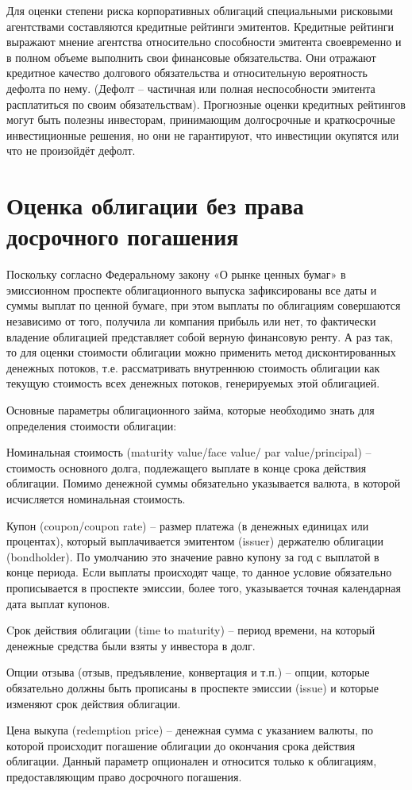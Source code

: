 Для оценки степени риска корпоративных облигаций специальными рисковыми агентствами составляются кредитные рейтинги эмитентов. Кредитные рейтинги выражают мнение агентства относительно способности эмитента своевременно и в полном объеме выполнить свои финансовые обязательства. Они отражают кредитное качество долгового обязательства и относительную вероятность дефолта по нему. (Дефолт – частичная или полная неспособности эмитента расплатиться по своим обязательствам). Прогнозные оценки кредитных рейтингов могут быть полезны инвесторам, принимающим долгосрочные и краткосрочные инвестиционные решения, но они не гарантируют, что инвестиции окупятся или что не произойдёт дефолт. 

\section{Оценка облигации без права досрочного погашения}

Поскольку согласно Федеральному закону «О рынке ценных бумаг» в эмиссионном проспекте облигационного выпуска зафиксированы все даты и суммы выплат по ценной бумаге, при этом выплаты по облигациям совершаются независимо от того, получила ли компания прибыль или нет, то фактически владение облигацией представляет собой верную финансовую ренту. А раз так, то для оценки стоимости облигации можно применить метод дисконтированных денежных потоков, т.е. рассматривать внутреннюю стоимость облигации как текущую стоимость всех денежных потоков, генерируемых этой облигацией.

Основные параметры облигационного займа, которые необходимо знать для определения стоимости облигации:
\begin{Enumerate}
 \item Номинальная стоимость (maturity value/face value/ par value/principal) – стоимость основного долга, подлежащего выплате в конце срока действия облигации. Помимо денежной суммы обязательно указывается валюта, в которой исчисляется номинальная стоимость.
 \item	Купон (coupon/coupon rate) – размер платежа (в денежных единицах или процентах), который выплачивается эмитентом (issuer) держателю облигации (bondholder). По умолчанию это значение равно купону за год с выплатой в конце периода. Если выплаты происходят чаще, то данное условие обязательно прописывается в проспекте эмиссии, более того, указывается точная календарная дата выплат купонов.
 \item Cрок действия облигации (time to maturity) – период времени, на который денежные средства были взяты у инвестора в долг.
 \item Опции отзыва (отзыв, предъявление, конвертация и т.п.) – опции, которые обязательно должны быть прописаны в проспекте эмиссии (issue) и которые изменяют срок действия облигации.
 \item Цена выкупа (redemption price) – денежная сумма с указанием валюты, по которой происходит погашение облигации до окончания срока действия облигации. Данный параметр опционален и относится только к облигациям, предоставляющим право досрочного погашения.
\end{Enumerate}

